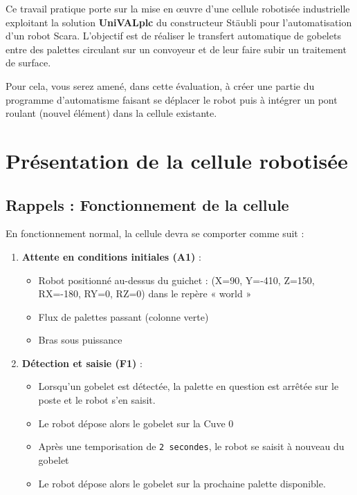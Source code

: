 Ce travail pratique porte sur la mise en œuvre d'une cellule robotisée industrielle exploitant la solution \textbf{UniVALplc} du constructeur Stäubli pour l'automatisation d'un robot Scara. L'objectif est de réaliser le transfert automatique de gobelets entre des palettes circulant sur un convoyeur et de leur faire subir un traitement de surface.

Pour cela, vous serez amené, dans cette évaluation, à créer une partie du programme d'automatisme faisant se déplacer le robot puis à intégrer un pont roulant (nouvel élément) dans la cellule existante.

\section{Présentation de la cellule robotisée}




\subsection{Rappels : Fonctionnement de la cellule}

En fonctionnement normal, la cellule devra se comporter comme suit :

\begin{enumerate}
    \item \textbf{Attente en conditions initiales (A1)} :
    \begin{itemize}
        \item Robot positionné au-dessus du guichet : (X=90, Y=-410, Z=150, RX=-180, RY=0, RZ=0) dans le repère « world »
        \item Flux de palettes passant (colonne verte)
        \item Bras sous puissance
    \end{itemize}

    \item \textbf{Détection et saisie (F1)} :
    \begin{itemize}
        \item Lorsqu'un gobelet est détectée, la palette en question est arrêtée sur le poste et le robot s'en saisit.
        \item Le robot dépose alors le gobelet sur la Cuve 0
        \item Après une temporisation de \texttt{2 secondes}, le robot se saisit à nouveau du gobelet
        \item Le robot dépose alors le gobelet sur la prochaine palette disponible. 
    \end{itemize}
\end{enumerate}


